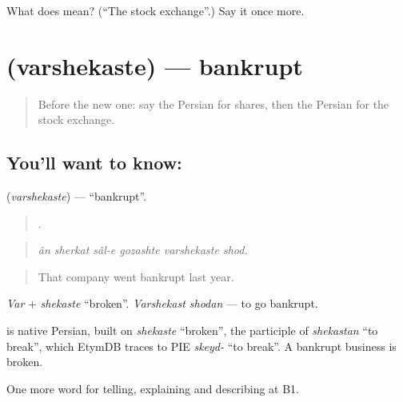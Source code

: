 \begin{tcolorbox}[breakable,colback=teal!4,colframe=teal!35!black,title={Before you move on}]
What does  mean? (\textquotedblleft{}The stock exchange\textquotedblright{}.) Say it once more.
\end{tcolorbox}
\section[\texorpdfstring{\fa{ورشکسته} (varshekaste)}{ورشکسته (varshekaste)}]{ (varshekaste) — bankrupt}

\label{lesson:FA-C412-varshekaste}



\begin{quote}
Before the new one: say the Persian for shares, then the Persian for the stock exchange.
\end{quote}

\subsection*{You'll want to know: }
\textbf{} (\emph{varshekaste}) — \textquotedblleft{}bankrupt\textquotedblright{}.

\begin{quote}
     .
\end{quote}

\begin{quote}
\emph{ân sherkat sâl-e gozashte varshekaste shod.}
\end{quote}

\begin{quote}
That company went bankrupt last year.
\end{quote}

\emph{Var} + \emph{shekaste} \textquotedblleft{}broken\textquotedblright{}. \emph{Varshekast shodan} — to go bankrupt.

\begin{cousinweb}
\textbf{} is native Persian, built on \emph{shekaste} \textquotedblleft{}broken\textquotedblright{}, the participle of \emph{shekastan} \textquotedblleft{}to break\textquotedblright{}, which EtymDB traces to PIE \emph{skeyd-} \textquotedblleft{}to break\textquotedblright{}. A bankrupt business is broken.
\end{cousinweb}

\begin{grammarlens}[title={What you've built}]
One more word for telling, explaining and describing at B1.
\end{grammarlens}

